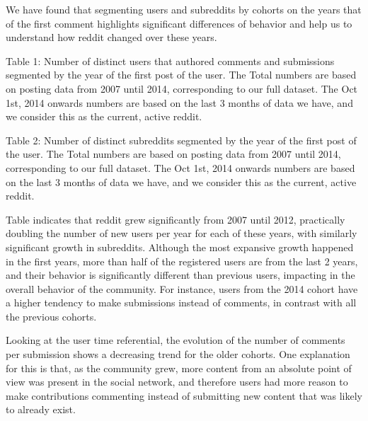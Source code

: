 
We have found that segmenting users and subreddits by cohorts on the years that of the first comment highlights significant differences of behavior and help us to understand how reddit changed over these years.


Table 1: Number of distinct users that authored comments and submissions segmented by the year of the first post of the user. The Total numbers are based on posting data from 2007 until 2014, corresponding to our full dataset. The Oct 1st, 2014 onwards numbers are based on the last 3 months of data we have, and we consider this as the current, active reddit.


Table 2: Number of distinct subreddits segmented by the year of the first post of the user. The Total numbers are based on posting data from 2007 until 2014, corresponding to our full dataset. The Oct 1st, 2014 onwards numbers are based on the last 3 months of data we have, and we consider this as the current, active reddit.

Table indicates that reddit grew significantly from 2007 until 2012, practically doubling the number of new users per year for each of these years, with similarly significant growth in subreddits. Although the most expansive growth happened in the first years, more than half of the registered users are from the last 2 years, and their behavior is significantly different than previous users, impacting in the overall behavior of the community. For instance, users from the 2014 cohort have a higher tendency to make submissions instead of comments, in contrast with all the previous cohorts.

Looking at the user time referential, the evolution of the number of comments per submission shows a decreasing trend for the older cohorts. One explanation for this is that, as the community grew, more content from an absolute point of view was present in the social network, and therefore users had more reason to make contributions commenting instead of submitting new content that was likely to already exist.

